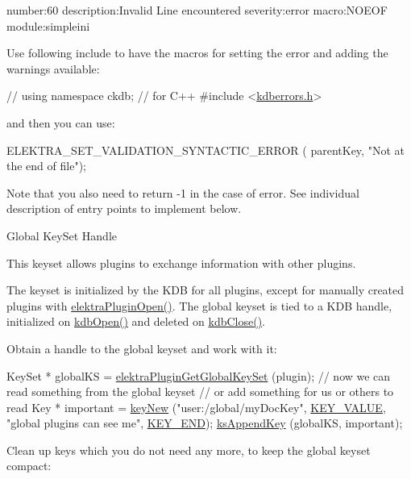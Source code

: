 \begin{DoxyCodeInclude}
number:60
description:Invalid Line encountered
severity:error
macro:NOEOF
module:simpleini
\end{DoxyCodeInclude}
 Use following include to have the macros for setting the error and adding the warnings available\+:


\begin{DoxyCodeInclude}
\textcolor{comment}{// using namespace ckdb; // for C++}
\textcolor{preprocessor}{#include <\hyperlink{kdberrors_8h}{kdberrors.h}>}
\end{DoxyCodeInclude}
 and then you can use\+:


\begin{DoxyCodeInclude}
ELEKTRA\_SET\_VALIDATION\_SYNTACTIC\_ERROR ( parentKey, \textcolor{stringliteral}{"Not at the end of file"});
\end{DoxyCodeInclude}
 Note that you also need to return -\/1 in the case of error. See individual description of entry points to implement below.

\begin{DoxyParagraph}{Global Key\+Set Handle}

\end{DoxyParagraph}
This keyset allows plugins to exchange information with other plugins.

The keyset is initialized by the K\+DB for all plugins, except for manually created plugins with {\ttfamily \hyperlink{elektra_2plugin_8c_a32a70a7876542c51d153164ac5108a57}{elektra\+Plugin\+Open()}}. The global keyset is tied to a K\+DB handle, initialized on {\ttfamily \hyperlink{group__kdb_ga844e1299a84c3fbf1d3a905c5c893ba5}{kdb\+Open()}} and deleted on {\ttfamily \hyperlink{group__kdb_gadb54dc9fda17ee07deb9444df745c96f}{kdb\+Close()}}.

Obtain a handle to the global keyset and work with it\+:


\begin{DoxyCodeInclude}
        KeySet * globalKS = \hyperlink{group__plugin_ga436cda13ed70c0face08661a90620bf6}{elektraPluginGetGlobalKeySet} (plugin);
        \textcolor{comment}{// now we can read something from the global keyset}
        \textcolor{comment}{// or add something for us or others to read}
        Key * important = \hyperlink{group__key_gad23c65b44bf48d773759e1f9a4d43b89}{keyNew} (\textcolor{stringliteral}{"user:/global/myDocKey"}, \hyperlink{group__key_gga9b703ca49f48b482def322b77d3e6bc8ac66e4a49d09212b79f5754ca6db5bd2e}{KEY\_VALUE}, \textcolor{stringliteral}{"global plugins can
       see me"}, \hyperlink{group__key_gga9b703ca49f48b482def322b77d3e6bc8aa8adb6fcb92dec58fb19410eacfdd403}{KEY\_END});
        \hyperlink{group__keyset_gaa5a1d467a4d71041edce68ea7748ce45}{ksAppendKey} (globalKS, important);
\end{DoxyCodeInclude}
 Clean up keys which you do not need any more, to keep the global keyset compact\+:


